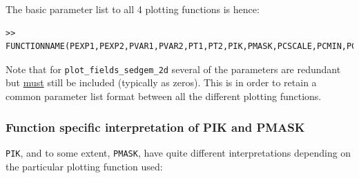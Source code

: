 \documentclass[11pt,fleqn]{book} %
\begin{document}
The basic parameter list to all 4 plotting functions is hence:
\footnotesize
\vspace{-4pt}\begin{verbatim}
>> FUNCTIONNAME(PEXP1,PEXP2,PVAR1,PVAR2,PT1,PT2,PIK,PMASK,PCSCALE,PCMIN,PCMAX,PCN,PDATA,POPT,PNAME);
\end{verbatim}\vspace{-4pt}
\normalsize

Note that for \texttt{plot\_fields\_sedgem\_2d} several of the parameters are redundant but \uline{must} still be included (typically as zeros). This is in order to retain a common parameter list format between all the different plotting functions.

\subsubsection{Function specific interpretation of PIK and PMASK}

\texttt{PIK}, and to some extent, \texttt{PMASK}, have quite different interpretations depending on the particular plotting function used:
\end{document}
